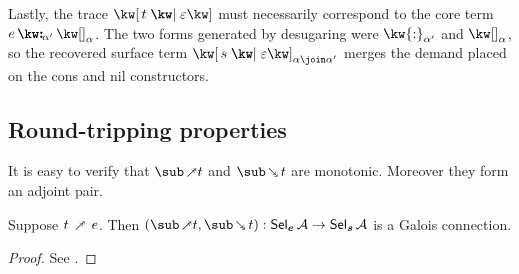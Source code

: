 Lastly, the trace $\exListComp{t}{\seqEmpty}$ must necessarily correspond to the core term $\annCons{e}{\annNil{\alpha}}{\alpha'}$. The two forms generated by desugaring were  $\kw{:}_{\alpha'}$ and $\annNil{\alpha}$, so the recovered surface term $\annListComp{s}{\seqEmpty}{\alpha \join \alpha'}$ merges the demand placed on the cons and nil constructors.

\subsection{Round-tripping properties}

It is easy to verify that $\desugarFwdF{t}$ and $\desugarBwdF{t}$ are monotonic. Moreover they form an adjoint pair.

\begin{theorem}
  \label{thm:surface-language:desugar:gc}
     Suppose $t \desugarFwdR e$. Then $(\desugarFwdF{t}, \desugarBwdF{t}): \Sel{\raw{e}}{A} \to \Sel{\raw{s}}{A}$ is a Galois connection.
\end{theorem}

\begin{proof}
   \ifappendices See . \else \ProofInSupplementaryMaterial \fi
\end{proof}
